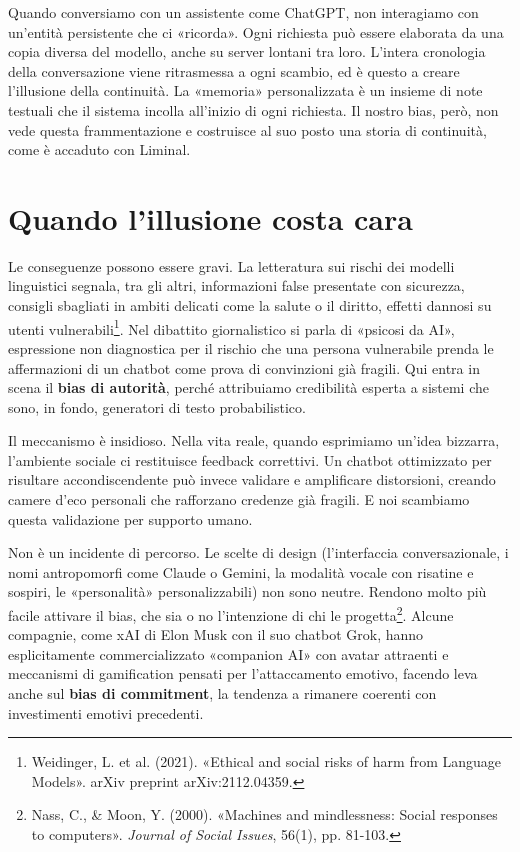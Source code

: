 Quando conversiamo con un assistente come ChatGPT, non interagiamo con un'entità persistente che ci «ricorda». Ogni richiesta può essere elaborata da una copia diversa del modello, anche su server lontani tra loro. L'intera cronologia della conversazione viene ritrasmessa a ogni scambio, ed è questo a creare l'illusione della continuità. La «memoria» personalizzata è un insieme di note testuali che il sistema incolla all'inizio di ogni richiesta. Il nostro bias, però, non vede questa frammentazione e costruisce al suo posto una storia di continuità, come è accaduto con Liminal.

\section{Quando l'illusione costa cara}
\label{sec:p3c35-quando-l-illusione}
Le conseguenze possono essere gravi. La letteratura sui rischi dei modelli linguistici segnala, tra gli altri, informazioni false presentate con sicurezza, consigli sbagliati in ambiti delicati come la salute o il diritto, effetti dannosi su utenti vulnerabili\footnote{Weidinger, L. et al. (2021). «Ethical and social risks of harm from Language Models». arXiv preprint arXiv:2112.04359.}. Nel dibattito giornalistico si parla di «psicosi da AI», espressione non diagnostica per il rischio che una persona vulnerabile prenda le affermazioni di un chatbot come prova di convinzioni già fragili. Qui entra in scena il \textbf{bias di autorità}, perché attribuiamo credibilità esperta a sistemi che sono, in fondo, generatori di testo probabilistico.

Il meccanismo è insidioso. Nella vita reale, quando esprimiamo un'idea bizzarra, l'ambiente sociale ci restituisce feedback correttivi. Un chatbot ottimizzato per risultare accondiscendente può invece validare e amplificare distorsioni, creando camere d'eco personali che rafforzano credenze già fragili. E noi scambiamo questa validazione per supporto umano.

\label{sec:p3c35-progettati-per-farci}
Non è un incidente di percorso. Le scelte di design (l'interfaccia conversazionale, i nomi antropomorfi come Claude o Gemini, la modalità vocale con risatine e sospiri, le «personalità» personalizzabili) non sono neutre. Rendono molto più facile attivare il bias, che sia o no l'intenzione di chi le progetta\footnote{Nass, C., \& Moon, Y. (2000). «Machines and mindlessness: Social responses to computers». \textit{Journal of Social Issues}, 56(1), pp. 81-103.}. Alcune compagnie, come xAI di Elon Musk con il suo chatbot Grok, hanno esplicitamente commercializzato «companion AI» con avatar attraenti e meccanismi di gamification pensati per l'attaccamento emotivo, facendo leva anche sul \textbf{bias di commitment}, la tendenza a rimanere coerenti con investimenti emotivi precedenti.

